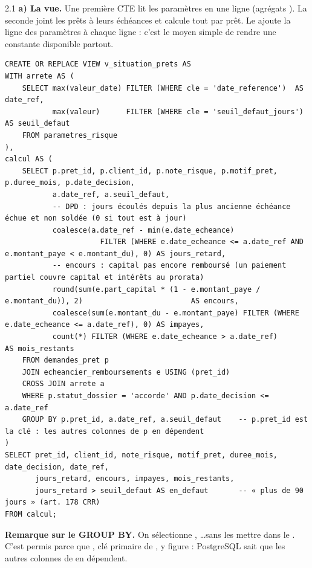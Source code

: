 \begin{correction}{2.1}
\textbf{a) La vue.} Une première CTE lit les paramètres en une ligne (agrégats ). La
seconde joint les prêts à leurs échéances et calcule tout par prêt. Le  ajoute la
ligne des paramètres à chaque ligne : c'est le moyen simple de rendre une constante disponible partout.

\begin{lstlisting}[style=long]
CREATE OR REPLACE VIEW v_situation_prets AS
WITH arrete AS (
    SELECT max(valeur_date) FILTER (WHERE cle = 'date_reference')  AS date_ref,
           max(valeur)      FILTER (WHERE cle = 'seuil_defaut_jours') AS seuil_defaut
    FROM parametres_risque
),
calcul AS (
    SELECT p.pret_id, p.client_id, p.note_risque, p.motif_pret, p.duree_mois, p.date_decision,
           a.date_ref, a.seuil_defaut,
           -- DPD : jours écoulés depuis la plus ancienne échéance échue et non soldée (0 si tout est à jour)
           coalesce(a.date_ref - min(e.date_echeance)
                      FILTER (WHERE e.date_echeance <= a.date_ref AND e.montant_paye < e.montant_du), 0) AS jours_retard,
           -- encours : capital pas encore remboursé (un paiement partiel couvre capital et intérêts au prorata)
           round(sum(e.part_capital * (1 - e.montant_paye / e.montant_du)), 2)                         AS encours,
           coalesce(sum(e.montant_du - e.montant_paye) FILTER (WHERE e.date_echeance <= a.date_ref), 0) AS impayes,
           count(*) FILTER (WHERE e.date_echeance > a.date_ref)                                        AS mois_restants
    FROM demandes_pret p
    JOIN echeancier_remboursements e USING (pret_id)
    CROSS JOIN arrete a
    WHERE p.statut_dossier = 'accorde' AND p.date_decision <= a.date_ref
    GROUP BY p.pret_id, a.date_ref, a.seuil_defaut    -- p.pret_id est la clé : les autres colonnes de p en dépendent
)
SELECT pret_id, client_id, note_risque, motif_pret, duree_mois, date_decision, date_ref,
       jours_retard, encours, impayes, mois_restants,
       jours_retard > seuil_defaut AS en_defaut       -- « plus de 90 jours » (art. 178 CRR)
FROM calcul;
\end{lstlisting}

\textbf{Remarque sur le GROUP BY.} On sélectionne , \dots sans
les mettre dans le . C'est permis parce que , clé primaire de
, y figure : PostgreSQL sait que les autres colonnes de  en dépendent.


\end{correction}
